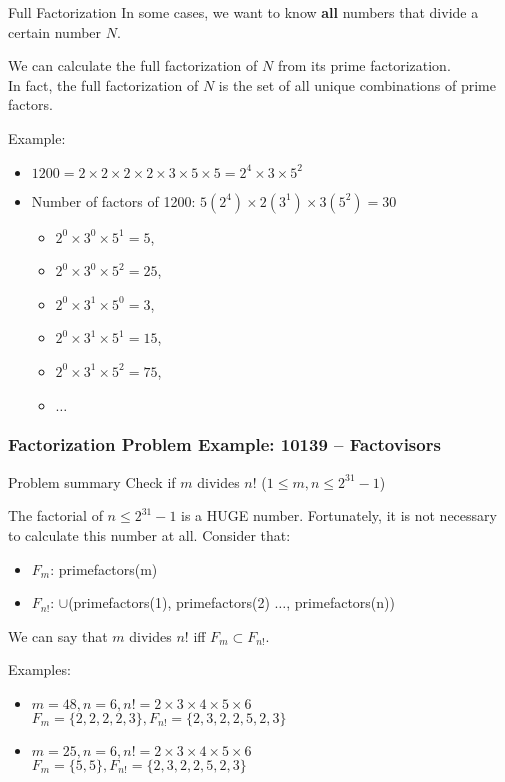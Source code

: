 \begin{frame}{Full Factorization}
  In some cases, we want to know {\bf all} numbers that divide a certain number $N$.\bigskip

  We can calculate the full factorization of $N$ from its prime factorization.\\
  In fact, the full factorization of $N$ is the set of all unique combinations of prime factors.\bigskip

  Example:
  \begin{itemize}
    \item $1200 = 2\times2\times2\times2\times3\times5\times5 = 2^4\times3\times5^2$
    \item Number of factors of 1200: $5(2^4)\times2(3^1)\times3(5^2) = 30$
    \begin{itemize}
      \item $2^0 \times 3^0 \times 5^1 = 5$,
      \item $2^0 \times 3^0 \times 5^2 = 25$,
      \item $2^0 \times 3^1 \times 5^0 = 3$,
      \item $2^0 \times 3^1 \times 5^1 = 15$,
      \item $2^0 \times 3^1 \times 5^2 = 75$,
      \item $\ldots$
    \end{itemize}
  \end{itemize}
\end{frame}

\begin{frame}
  \frametitle{Factorization Problem Example: 10139 -- Factovisors}

    \begin{block}{Problem summary}
      Check if $m$ divides $n!$ ($1 \leq m,n \leq 2^{31}-1$)
    \end{block}

    The factorial of $n \leq 2^{31}-1$ is a HUGE number. Fortunately, it is not necessary to calculate this number at all. Consider that:

    \begin{itemize}
    \item $F_m$: primefactors(m)
    \item $F_{n!}$: $\cup$(primefactors(1), primefactors(2) $\ldots$, primefactors(n))
    \end{itemize}

    We can say that $m$ divides $n!$ iff $F_m \subset F_{n!}$.\bigskip

    Examples:
    \begin{itemize}
    \item $m = 48, n=6, n! = 2\times3\times4\times5\times6$\\
      $F_m = \{2,2,2,2,3\}, F_{n!} = \{2,3,2,2,5,2,3\}$

  \medskip

    \item $m = 25, n=6, n! = 2\times3\times4\times5\times6$\\
      $F_m = \{5,5\}, F_{n!} = \{2,3,2,2,5,2,3\}$

    \end{itemize}
\end{frame}


